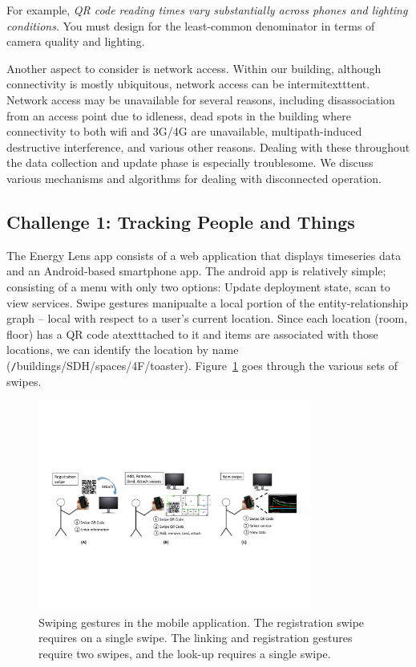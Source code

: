 For example, \emph{QR code reading times vary substantially across phones
and lighting conditions}.  You must design for the least-common denominator in terms of camera quality and lighting.

Another aspect to consider is network access.  Within our building, although connectivity is mostly ubiquitous, network
access can be intermitextttent.  Network access may be unavailable for several reasons, including disassociation from an access point due
to idleness, dead spots in the building where connectivity to both wifi and 3G/4G are unavailable, multipath-induced
destructive interference, and various other reasons.  Dealing with these throughout the data collection and update phase is
especially troublesome.  We discuss various mechanisms and algorithms for dealing with disconnected operation.


\subsection{Challenge 1: Tracking People and Things}
\label{sec:tracking}

The Energy Lens app consists of a web application that displays timeseries data and an Android-based smartphone
app.
The android app is relatively simple; consisting of a menu with only two options: Update deployment state, scan to view services.
Swipe gestures manipualte a local portion of the entity-relationship graph -- local with respect to a user's current location.
Since each location (room, floor) has a QR code atextttached to it and items are associated with those locations, we
can identify the location by name ({\texttt /buildings/SDH/spaces/4F/toaster}).  
Figure~\ref{fig:swipes} goes through the various sets 
of swipes.

\begin{figure}[htb!]
\begin{center}
\includegraphics[width=0.8\textwidth]{figs/swipes}
\caption{Swiping gestures in the mobile application.  The registration swipe requires on a single swipe.  The 
linking and registration gestures require two swipes, and the look-up requires a single swipe.}
\label{fig:swipes}
\end{center}
\end{figure}

